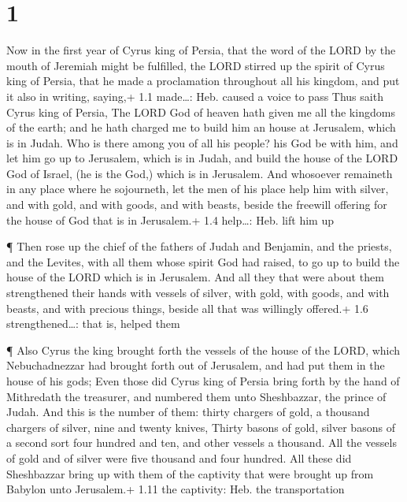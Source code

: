 \hypertarget{section}{%
\section{1}\label{section}}

 Now in the first year of Cyrus king of Persia, that the
word of the LORD by the mouth of Jeremiah might be fulfilled, the LORD
stirred up the spirit of Cyrus king of Persia, that he made a
proclamation throughout all his kingdom, and put it also in writing,
saying,+ 1.1 made\ldots: Heb. caused a voice to pass  Thus
saith Cyrus king of Persia, The LORD God of heaven hath given me all the
kingdoms of the earth; and he hath charged me to build him an house at
Jerusalem, which is in Judah.  Who is there among you of all
his people? his God be with him, and let him go up to Jerusalem, which
is in Judah, and build the house of the LORD God of Israel, (he is the
God,) which is in Jerusalem.  And whosoever remaineth in any
place where he sojourneth, let the men of his place help him with
silver, and with gold, and with goods, and with beasts, beside the
freewill offering for the house of God that is in Jerusalem.+ 1.4
help\ldots: Heb. lift him up

 ¶ Then rose up the chief of the fathers of Judah and
Benjamin, and the priests, and the Levites, with all them whose spirit
God had raised, to go up to build the house of the LORD which is in
Jerusalem.  And all they that were about them strengthened
their hands with vessels of silver, with gold, with goods, and with
beasts, and with precious things, beside all that was willingly
offered.+ 1.6 strengthened\ldots: that is, helped them

 ¶ Also Cyrus the king brought forth the vessels of the
house of the LORD, which Nebuchadnezzar had brought forth out of
Jerusalem, and had put them in the house of his gods;  Even
those did Cyrus king of Persia bring forth by the hand of Mithredath the
treasurer, and numbered them unto Sheshbazzar, the prince of Judah.
 And this is the number of them: thirty chargers of gold, a
thousand chargers of silver, nine and twenty knives, 
Thirty basons of gold, silver basons of a second sort four hundred and
ten, and other vessels a thousand.  All the vessels of gold
and of silver were five thousand and four hundred. All these did
Sheshbazzar bring up with them of the captivity that were brought up
from Babylon unto Jerusalem.+ 1.11 the captivity: Heb. the
transportation

